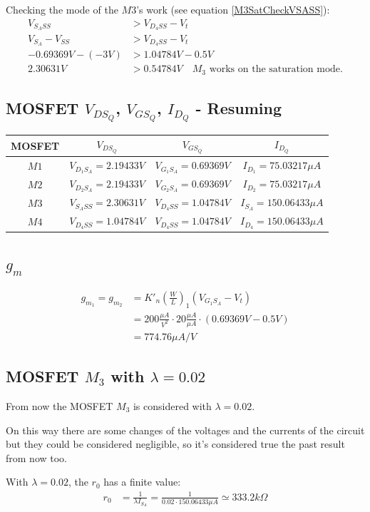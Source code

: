 \documentclass[10pt,a4paper]{book}
\begin{document}
Checking the mode of the $M3$'s work (see equation \ref{M3SatCheckVSASS}):
\begin{align}
V_{{S_A}SS} &> V_{{D_4}SS} - V_t\\
V_{S_A} - V_{SS} &> V_{{D_4}SS} - V_t\\
-0.69369V - (-3V) &> 1.04784V - 0.5V\\
2.30631V &> 0.54784V \quad M_3\text{ works on the saturation mode.}
\end{align}

\subsection{MOSFET $V_{DS_Q}$, $V_{GS_Q}$, $I_{D_Q}$ - Resuming}
\begin{center}
\begin{tabular}{|c|c|c|c|}
\hline
MOSFET & $V_{DS_Q}$ & $V_{GS_Q}$ & $I_{D_Q}$ \\
\hline
$M1$ & $V_{D_1S_A} = 2.19433V$ & $V_{G_1S_A} = 0.69369V$ & $I_{D_1} = 75.03217\mu A$ \\
\hline
$M2$ & $V_{D_2S_A} = 2.19433V$ & $V_{G_2S_A} = 0.69369V$ & $I_{D_2} = 75.03217\mu A$ \\
\hline
$M3$ & $V_{S_ASS} = 2.30631V$ & $V_{D_4SS} = 1.04784V$ & $I_{S_A} = 150.06433 \mu A$ \\
\hline
$M4$ & $V_{D_4SS} = 1.04784V$ & $V_{D_4SS} = 1.04784V$ & $I_{D_4} = 150.06433 \mu A$ \\
\hline
\end{tabular}
\end{center}

\subsection{$g_m$}
\begin{align}
g_{m_1} = g_{m_2} &= K'_n \left(\frac{W}{L}\right)_1 (V_{G_1S_A} - V_t)\\
&= 200 \frac{\mu A}{V^2} \cdot 20 \frac{\mu A}{\mu A} \cdot (0.69369V-0.5V)\\
&= 774.76 \mu A/V
\end{align}

\subsection{MOSFET $M_3$ with $\lambda = 0.02$}
From now the MOSFET $M_3$ is considered with $\lambda = 0.02$.\par
On this way there are some changes of the voltages and the currents of the circuit but they could be considered negligible, so it's considered true the past result from now too.\par
With $\lambda = 0.02$, the $r_0$ has a finite value:\\
\begin{align}
r_0 &= \frac{1}{\lambda I_{S_A}}
= \frac{1}{0.02 \cdot 150.06433 \mu A}
\simeq 333.2k\Omega
\end{align}
\end{document}

